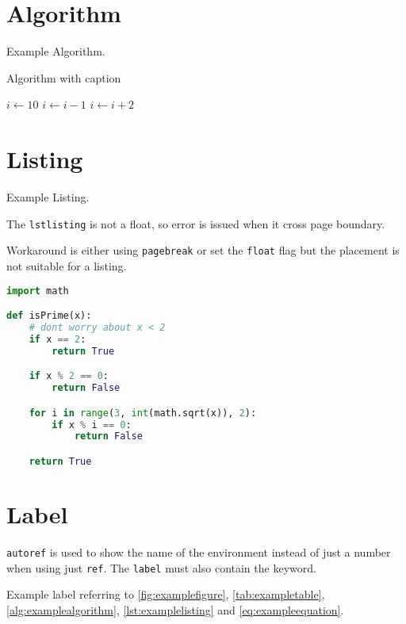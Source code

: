 \section{Algorithm}

Example Algorithm.

\begin{algorithm}
  \centering
  \caption{Algorithm with caption}
  \label{alg:examplealgorithm}
  \begin{algorithmic}
  \State $i \gets 10$
    \State $i \gets i-1$
  \Else
      \State $i \gets i+2$
    \EndIf
  \EndIf
  \end{algorithmic}
\end{algorithm}


\pagebreak

\section{Listing}

Example Listing.

The \texttt{lstlisting} is not a float,
so error is issued when it cross page boundary.

Workaround is either using \texttt{pagebreak} or
set the \texttt{float} flag but the placement is not suitable for a listing.

\begin{lstlisting}[language=Python, caption=Example Listing, label={lst:examplelisting}]
import math

def isPrime(x):
    # dont worry about x < 2
    if x == 2:
        return True

    if x % 2 == 0:
        return False

    for i in range(3, int(math.sqrt(x)), 2):
        if x % i == 0:
            return False

    return True
\end{lstlisting}

\section{Label}

\texttt{autoref} is used to show the name of the environment
instead of just a number when using just \texttt{ref}.
The \texttt{label} must also contain the keyword.

Example label referring to \autoref{fig:examplefigure}, \autoref{tab:exampletable},
\autoref{alg:examplealgorithm}, \autoref{lst:examplelisting} and \autoref{eq:exampleequation}.

